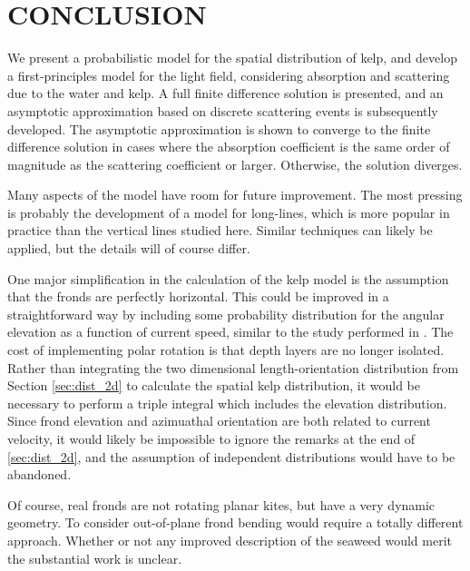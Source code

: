 \chapter{CONCLUSION}
\label{chap:conclusion}


We present a probabilistic model for the spatial distribution of kelp, and develop a first-principles model for the light field, considering absorption and scattering due to the water and kelp.
A full finite difference solution is presented, and an asymptotic approximation based on discrete scattering events is subsequently developed.
The asymptotic approximation is shown to converge to the finite difference solution in cases where the absorption coefficient is the same order
of magnitude as the scattering coefficient or larger.
Otherwise, the solution diverges.

Many aspects of the model have room for future improvement.
The most pressing is probably the development of a model for long-lines, which
is more popular in practice than the vertical lines studied here.
Similar techniques can likely be applied, but the details will of course differ.

One major simplification in the calculation of the kelp model
is the assumption that the fronds are perfectly horizontal.
This could be improved in a straightforward way by including some
probability distribution for the angular elevation as a function of current speed,
similar to the study performed in \citep{norvik_design_2017}.
The cost of implementing polar rotation is that depth layers are no longer isolated.
Rather than integrating the two dimensional length-orientation distribution from
Section \ref{sec:dist_2d} to calculate the spatial kelp distribution,
it would be necessary to perform a triple integral which includes the elevation distribution.
Since frond elevation and azimuathal orientation are both related to current velocity,
it would likely be impossible to ignore the remarks at the end of \ref{sec:dist_2d}, and the
assumption of independent distributions would have to be abandoned.

Of course, real fronds are not rotating planar kites, but have a very dynamic geometry.
To consider out-of-plane frond bending would require a totally different approach.
Whether or not any improved description of the seaweed would merit the substantial work is unclear.
